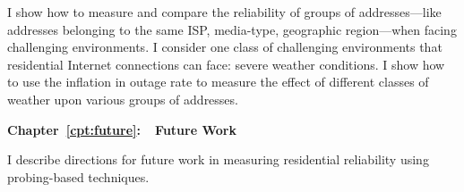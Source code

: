 I show how to measure and compare the reliability of groups of addresses---like
addresses belonging to the same ISP, media-type, geographic
region---when facing challenging environments. I consider one class of
challenging environments that residential Internet connections can
face: severe weather conditions. I show how to use the inflation in
outage rate to measure the effect
of different classes of weather upon various groups of addresses.

\textbf{Chapter~\ref{cpt:future}:~~Future Work} 

I describe directions for future work in measuring residential
reliability using probing-based techniques.








